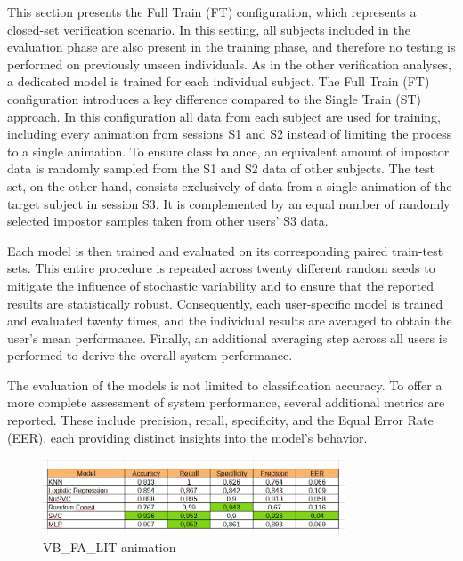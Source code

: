 \documentclass{article}
\begin{document}
This section presents the Full Train (FT) configuration, which represents a closed-set verification scenario. 
In this setting, all subjects included in the evaluation phase are also present in the training phase, and therefore no testing is performed on previously unseen individuals.
As in the other verification analyses, a dedicated model is trained for each individual subject. 
The Full Train (FT) configuration introduces a key difference compared to the Single Train (ST) approach. 
In this configuration all data from each subject are used for training, including every animation from sessions S1 and S2 instead of limiting the process to a single animation.
To ensure class balance, an equivalent amount of impostor data is randomly sampled from the S1 and S2 data of other subjects.
The test set, on the other hand, consists exclusively of data from a single animation of the target subject in session S3. 
It is complemented by an equal number of randomly selected impostor samples taken from other users' S3 data.

Each model is then trained and evaluated on its corresponding paired train-test sets.
This entire procedure is repeated across twenty different random seeds to mitigate the influence of stochastic variability and to ensure that the reported results are statistically robust. 
Consequently, each user-specific model is trained and evaluated twenty times, and the individual results are averaged to obtain the user's mean performance. 
Finally, an additional averaging step across all users is performed to derive the overall system performance.

The evaluation of the models is not limited to classification accuracy. 
To offer a more complete assessment of system performance, several additional metrics are reported. 
These include precision, recall, specificity, and the Equal Error Rate (EER), each providing distinct insights into the model's behavior.

\begin{figure}[ht]
    \centering
    \includegraphics[width=0.8\textwidth]{Images/Results/Verification_single/ft/VB_FA_LIT.png}
    \caption{VB\_FA\_LIT animation}
    \label{fig:VB_FA_LIT_ft}
\end{figure}
\end{document}
